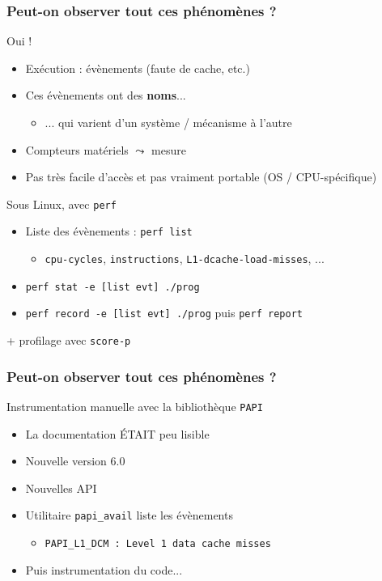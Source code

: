 \documentclass[xcolor={x11names,svgnames}]{beamer}
\begin{document}
\begin{frame}
  \frametitle{Peut-on observer tout ces phénomènes ?}

  \begin{exampleblock}{Oui !}
    \begin{itemize}
    \item Exécution : \og évènements\fg{} (faute de cache, etc.)
    \item Ces évènements ont des \textbf{noms}...
      \begin{itemize}
      \item ... qui varient d'un système / mécanisme à l'autre
      \end{itemize}
    \item Compteurs matériels $\leadsto$ mesure
    \item Pas très facile d'accès et pas vraiment portable (OS / CPU-spécifique)
    \end{itemize}
  \end{exampleblock}
  
  \begin{block}{Sous Linux, avec \texttt{perf}}
    \begin{itemize}
    \item Liste des évènements : \texttt{perf list}
      \begin{itemize}
      \item \texttt{cpu-cycles}, \texttt{instructions}, \texttt{L1-dcache-load-misses}, ...
      \end{itemize}
    \item \texttt{perf stat -e [list evt] ./prog}
    \item \texttt{perf record -e [list evt] ./prog} puis \texttt{perf report}
    \end{itemize}
  \end{block}

  + profilage avec \texttt{score-p}
\end{frame}


\begin{frame}
  \frametitle{Peut-on observer tout ces phénomènes ?}

  \begin{alertblock}{Instrumentation manuelle avec la bibliothèque \texttt{PAPI}}
    \begin{itemize}
    \item La documentation ÉTAIT peu lisible
    \item Nouvelle version 6.0
    \item Nouvelles API
    \item Utilitaire \texttt{papi\_avail} liste les évènements
      \begin{itemize}
      \item \texttt{PAPI\_L1\_DCM  : Level 1 data cache misses}
      \end{itemize}
    \item Puis instrumentation du code...
    \end{itemize}
  \end{alertblock}
\end{frame}
\end{document}

